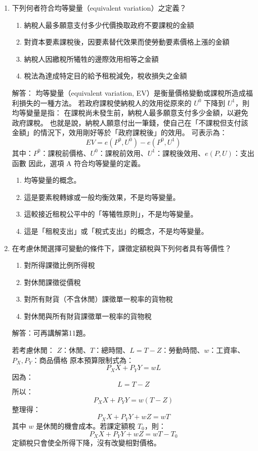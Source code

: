 \documentclass[12pt, a4paper]{article}
\begin{document}
\begin{enumerate}
    \item 下列何者符合均等變量（equivalent variation）之定義？
    \begin{enumerate}[label=\Alph*.]
        \item 納稅人最多願意支付多少代價換取政府不要課稅的金額
        \item 對資本要素課稅後，因要素替代效果而使勞動要素價格上漲的金額
        \item 納稅人因繳稅所犧牲的邊際效用相等之金額
        \item 稅法為達成特定目的給予租稅減免，稅收損失之金額
    \end{enumerate}
    解答：
    均等變量（equivalent variation, EV）是衡量價格變動或課稅所造成福利損失的一種方法。
    若政府課稅使納稅人的效用從原來的 \(U^0\) 下降到 \(U^1\)，則均等變量是指：
    在課稅尚未發生前，納稅人最多願意支付多少金額，以避免政府課稅。
    也就是說，納稅人願意付出一筆錢，使自己在「不課稅但支付該金額」的情況下，效用剛好等於「政府課稅後」的效用。
    可表示為：
    \[
    EV = e(P^0,U^0) - e(P^0,U^1)
    \]
    其中：\(P^0\)：課稅前價格、\(U^0\)：課稅前效用、\(U^1\)：課稅後效用、\(e(P,U)\)：支出函數
    因此，選項 A 符合均等變量的定義。
    \begin{enumerate}[label=\Alph*.]
        \item 均等變量的概念。
        \item 這是要素稅轉嫁或一般均衡效果，不是均等變量。
        \item 這較接近租稅公平中的「等犧牲原則」，不是均等變量。
        \item 這是「租稅支出」或「稅式支出」的概念，不是均等變量。
    \end{enumerate}

    \item 在考慮休閒選擇可變動的條件下，課徵定額稅與下列何者具有等價性？
    \begin{enumerate}[label=\Alph*.]
        \item 對所得課徵比例所得稅
        \item 對休閒課徵從價稅
        \item 對所有財貨（不含休閒）課徵單一稅率的貨物稅
        \item 對休閒與所有財貨課徵單一稅率的貨物稅
    \end{enumerate}
    解答：可再講解第11題。

    若考慮休閒：
	\(Z\)：休閒、\(T\)：總時間、\(L = T - Z\)：勞動時間、\(w\)：工資率、\(P_X, P_Y\)：商品價格
    原本預算限制式為：
    \[
    P_X X + P_Y Y = wL
    \]
    因為：
    \[
    L = T - Z
    \]
    所以：
    \[
    P_X X + P_Y Y = w(T-Z)
    \]
    整理得：
    \[
    P_X X + P_Y Y + wZ = wT
    \]
    其中 \(w\) 是休閒的機會成本。若課定額稅 \(T_0\)，則：
    \[
    P_X X + P_Y Y + wZ = wT - T_0
    \]
    定額稅只會使全所得下降，沒有改變相對價格。


\end{enumerate}
\end{document}
